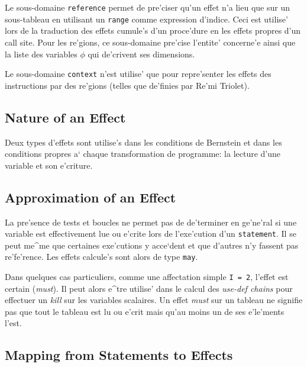 {Le sous-domaine {\tt reference} permet de pre'ciser qu'un effet n'a lieu que
sur un sous-tableau en utilisant un {\tt range} comme expression d'indice.
Ceci est utilise' lors de la traduction des effets cumule's d'un proce'dure
en les effets propres d'un call site. Pour les re'gions, ce sous-domaine
pre'cise l'entite' concerne'e ainsi que la liste des variables $\phi$ qui
de'crivent ses dimensions.

Le sous-domaine {\tt context} n'est utilise' que pour repre'senter les
effets des instructions par des re'gions (telles que de'finies par Re'mi
Triolet).

\subsection{Nature of an Effect}
\label{subsection-action}

{}

Deux types d'effets sont utilise's dans les conditions de Bernstein
et dans les conditions propres a` chaque transformation de programme:
la lecture d'une variable et son e'criture.

\subsection{Approximation of an Effect}
\label{subsection-approximation}

{}

La pre'sence de tests et boucles ne permet pas de de'terminer en ge'ne'ral
si une variable est effectivement lue ou e'crite lors de l'exe'cution
d'un {\tt statement}. Il se peut me^me que certaines exe'cutions
y acce`dent et que d'autres n'y fassent pas re'fe'rence. Les effets
calcule's sont alors de type {\tt may}.

Dans quelques cas particuliers, comme une affectation simple {\tt I = 2},
l'effet est certain ({\em must}). Il peut alors e^tre utilise' dans
le calcul des {\em use-def chains} pour effectuer un {\em kill} sur les
variables scalaires. Un effet {\em must} sur un tableau ne signifie pas
que tout le tableau est lu ou e'crit mais qu'au moins un de ses
e'le'ments l'est.

\subsection{Mapping from Statements to Effects}

}
